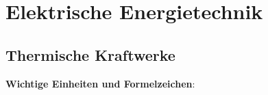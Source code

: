 \section{Elektrische Energietechnik}

\subsection{Thermische Kraftwerke}
\textbf{Wichtige Einheiten und Formelzeichen}: